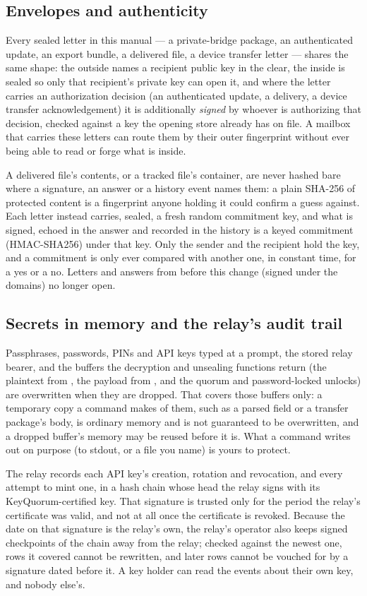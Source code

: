 \subsection{Envelopes and authenticity}

Every sealed letter in this manual --- a private-bridge package, an
authenticated update, an export bundle, a delivered file, a device transfer
letter --- shares the same shape: the outside names a recipient public key
in the clear, the inside is sealed so only that recipient's private key can
open it, and where the letter carries an authorization decision (an
authenticated update, a delivery, a device transfer acknowledgement) it is
additionally \emph{signed} by whoever is authorizing that decision, checked
against a key the opening store already has on file. A mailbox that carries
these letters can route them by their outer fingerprint without ever being
able to read or forge what is inside.

A delivered file's contents, or a tracked file's container, are never hashed
bare where a signature, an answer or a history event names them: a plain
SHA-256 of protected content is a fingerprint anyone holding it could confirm
a guess against. Each letter instead carries, sealed, a fresh random
commitment key, and what is signed, echoed in the answer and recorded in the
history is a keyed commitment (HMAC-SHA256) under that key. Only the sender
and the recipient hold the key, and a commitment is only ever compared with
another one, in constant time, for a yes or a no. Letters and answers from
before this change (signed under the  domains) no longer open.

\subsection{Secrets in memory and the relay's audit trail}

Passphrases, passwords, PINs and API keys typed at a prompt, the stored relay
bearer, and the buffers the decryption and unsealing functions return (the
plaintext from , the payload from ,
and the quorum and password-locked unlocks) are overwritten when they are
dropped. That covers those buffers only: a temporary copy a command makes of
them, such as a parsed field or a transfer package's body, is ordinary memory
and is not guaranteed to be overwritten, and a dropped buffer's memory may be
reused before it is. What a command writes out on purpose (to stdout, or a
file you name) is yours to protect.

The relay records each API key's creation, rotation and revocation, and every
attempt to mint one, in a hash chain whose head the relay signs with its
KeyQuorum-certified key. That signature is trusted only for the period the
relay's certificate was valid, and not at all once the certificate is revoked.
Because the date on that signature is the relay's own, the relay's operator
also keeps signed checkpoints of the chain away from the relay; checked
against the newest one, rows it covered cannot be rewritten, and later rows
cannot be vouched for by a signature dated before it.
A key holder can read the events about their own key, and nobody else's.

